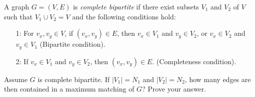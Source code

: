 A graph $G=(V,E)$ is {\em complete bipartite} if there exist subsets
$V_{1}$ and $V_{2}$ of $V$ such that $V_{1} \cup  V_{2}=V$ and the
following conditions hold:

\begin{enumerate}

\item  [1:] For $v_{x}, v_{y} \in  V$, if $(v_{x},v_{y}) \in  E$, then 
           $v_{x}\in  V_{1}$ and $v_{y}\in  V_{2}$,
           or $v_{x}\in  V_{2}$ and $v_{y}\in  V_{1}$ (Bipartite condition).

\item  [2:] If $v_{x}\in  V_{1}$ and $v_{y}\in  V_{2}$, then $(v_{x},v_{y})\in  E$.
           (Completeness condition).

\end{enumerate}

Assume $G$ is complete bipartite.  If $|V_{1}|=N_{1}$ and $|V_{2}|=N_{2}$,
how many edges are then contained in a maximum matching of $G$?  
Prove your answer.


